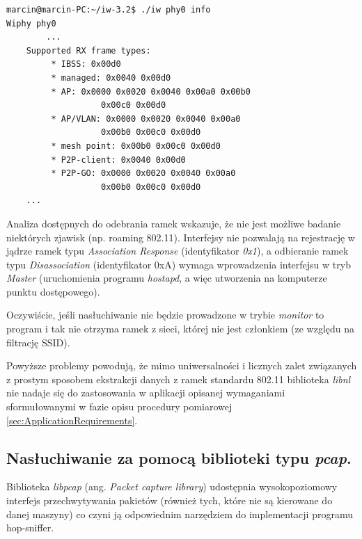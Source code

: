 \begin{lstlisting}[frame=tb]
marcin@marcin-PC:~/iw-3.2$ ./iw phy0 info
Wiphy phy0
        ...
	Supported RX frame types:
		 * IBSS: 0x00d0
		 * managed: 0x0040 0x00d0
		 * AP: 0x0000 0x0020 0x0040 0x00a0 0x00b0 
                   0x00c0 0x00d0
		 * AP/VLAN: 0x0000 0x0020 0x0040 0x00a0 
                   0x00b0 0x00c0 0x00d0
		 * mesh point: 0x00b0 0x00c0 0x00d0
		 * P2P-client: 0x0040 0x00d0
		 * P2P-GO: 0x0000 0x0020 0x0040 0x00a0 
                   0x00b0 0x00c0 0x00d0
	...
\end{lstlisting}

Analiza dostępnych do odebrania ramek wskazuje, że nie jest możliwe badanie niektórych zjawisk (np. roaming 802.11). Interfejsy nie pozwalają na rejestrację w jądrze ramek typu \emph{Association Response} (identyfikator \emph{0x1}), a odbieranie ramek typu \emph{Disassociation} (identyfikator 0xA) wymaga wprowadzenia interfejsu w tryb \emph{Master} (uruchomienia programu \emph{hostapd}, a więc utworzenia na komputerze punktu dostępowego). 

Oczywiście, jeśli nasłuchiwanie nie będzie prowadzone w trybie \emph{monitor} to program i tak nie otrzyma ramek z sieci, której nie jest członkiem (ze względu na filtrację SSID). 

Powyższe problemy powodują, że mimo uniwersalności i licznych zalet związanych z prostym sposobem ekstrakcji danych z ramek standardu 802.11 biblioteka \emph{libnl} nie nadaje się do zastosowania w aplikacji opisanej wymaganiami sformułowanymi w fazie opisu procedury pomiarowej \ref{sec:ApplicationRequirements}. 

\subsection{Nasłuchiwanie za pomocą biblioteki typu \emph{pcap}.}
\label{sec:LibPcap}

Biblioteka \emph{libpcap} (ang. \emph{Packet capture library}) udostępnia wysokopoziomowy interfejs przechwytywania pakietów (również tych, które nie są kierowane do danej maszyny) co czyni ją odpowiednim narzędziem do implementacji programu hop-sniffer. 

